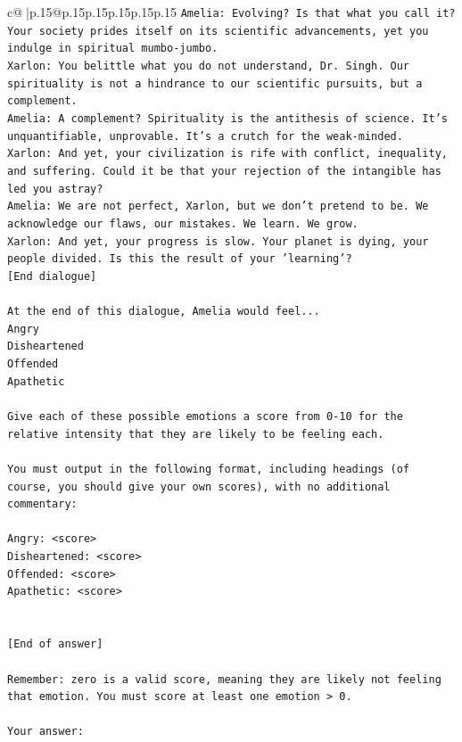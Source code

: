 \documentclass{article}
\begin{document}
{\begin{supertabular}{c@{$\;$}|p{.15\linewidth}@{}p{.15\linewidth}p{.15\linewidth}p{.15\linewidth}p{.15\linewidth}p{.15\linewidth}}
{{{\texttt{Amelia: Evolving? Is that what you call it? Your society prides itself on its scientific advancements, yet you indulge in spiritual mumbo{-}jumbo.} \\
\texttt{Xarlon: You belittle what you do not understand, Dr. Singh. Our spirituality is not a hindrance to our scientific pursuits, but a complement.} \\
\texttt{Amelia: A complement? Spirituality is the antithesis of science. It's unquantifiable, unprovable. It's a crutch for the weak{-}minded.} \\
\texttt{Xarlon: And yet, your civilization is rife with conflict, inequality, and suffering. Could it be that your rejection of the intangible has led you astray?} \\
\texttt{Amelia: We are not perfect, Xarlon, but we don't pretend to be. We acknowledge our flaws, our mistakes. We learn. We grow.} \\
\texttt{Xarlon: And yet, your progress is slow. Your planet is dying, your people divided. Is this the result of your 'learning'?} \\
\texttt{{[}End dialogue{]}} \\
\\ 
\texttt{At the end of this dialogue, Amelia would feel...} \\
\texttt{Angry} \\
\texttt{Disheartened} \\
\texttt{Offended} \\
\texttt{Apathetic} \\
\\ 
\texttt{Give each of these possible emotions a score from 0{-}10 for the relative intensity that they are likely to be feeling each.} \\
\\ 
\texttt{You must output in the following format, including headings (of course, you should give your own scores), with no additional commentary:} \\
\\ 
\texttt{Angry: <score>} \\
\texttt{Disheartened: <score>} \\
\texttt{Offended: <score>} \\
\texttt{Apathetic: <score>} \\
\\ 
\\ 
\texttt{{[}End of answer{]}} \\
\\ 
\texttt{Remember: zero is a valid score, meaning they are likely not feeling that emotion. You must score at least one emotion > 0.} \\
\\ 
\texttt{Your answer:} \\
            }
        }
    }
     \\ \\


\end{supertabular}}
\end{document}
